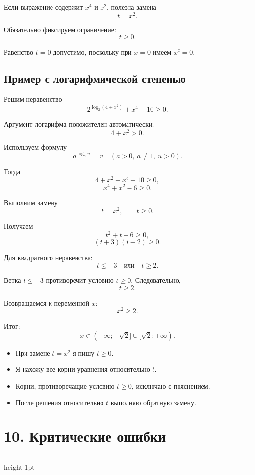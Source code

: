\documentclass[a4paper,12pt]{article}
\newcommand{\checkitem}{\item[$\square$]}
\newcommand{\sectionrule}{%
  \vspace{-2mm}
  {\color{lightaccent}\hrule height 1pt}
  \vspace{3mm}
}
\begin{document}
Если выражение содержит \(x^4\) и \(x^2\), полезна замена
\[
t=x^2.
\]

Обязательно фиксируем ограничение:
\[
\boxed{t\ge0.}
\]

Равенство \(t=0\) допустимо, поскольку при \(x=0\) имеем \(x^2=0\).

\subsection*{\textcolor{accent}{Пример с логарифмической степенью}}

Решим неравенство
\[
2^{\log_2(4+x^2)}+x^4-10\ge0.
\]

Аргумент логарифма положителен автоматически:
\[
4+x^2>0.
\]

Используем формулу
\[
a^{\log_a u}=u
\quad
(a>0,\ a\ne1,\ u>0).
\]

Тогда
\[
4+x^2+x^4-10\ge0,
\]
\[
x^4+x^2-6\ge0.
\]

Выполним замену
\[
t=x^2,\qquad t\ge0.
\]

Получаем
\[
t^2+t-6\ge0,
\]
\[
(t+3)(t-2)\ge0.
\]

Для квадратного неравенства:
\[
t\le-3
\quad\text{или}\quad
t\ge2.
\]

Ветка \(t\le-3\) противоречит условию \(t\ge0\). Следовательно,
\[
t\ge2.
\]

Возвращаемся к переменной \(x\):
\[
x^2\ge2.
\]

Итог:
\[
\boxed{
x\in(-\infty;-\sqrt2]\cup[\sqrt2;+\infty).
}
\]

\begin{itemize}
  \checkitem При замене \(t=x^2\) я пишу \(t\ge0\).
  \checkitem Я нахожу все корни уравнения относительно \(t\).
  \checkitem Корни, противоречащие условию \(t\ge0\), исключаю с пояснением.
  \checkitem После решения относительно \(t\) выполняю обратную замену.
\end{itemize}


\section*{\textcolor{darkaccent}{10. Критические ошибки}}
\sectionrule
\end{document}
